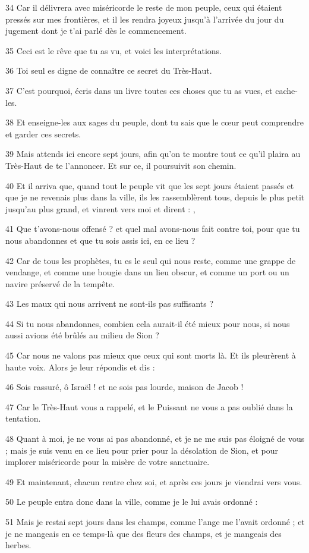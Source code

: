 \par 34 Car il délivrera avec miséricorde le reste de mon peuple, ceux qui étaient pressés sur mes frontières, et il les rendra joyeux jusqu'à l'arrivée du jour du jugement dont je t'ai parlé dès le commencement.
\par 35 Ceci est le rêve que tu as vu, et voici les interprétations.
\par 36 Toi seul es digne de connaître ce secret du Très-Haut.
\par 37 C'est pourquoi, écris dans un livre toutes ces choses que tu as vues, et cache-les.
\par 38 Et enseigne-les aux sages du peuple, dont tu sais que le cœur peut comprendre et garder ces secrets.
\par 39 Mais attends ici encore sept jours, afin qu'on te montre tout ce qu'il plaira au Très-Haut de te l'annoncer. Et sur ce, il poursuivit son chemin.
\par 40 Et il arriva que, quand tout le peuple vit que les sept jours étaient passés et que je ne revenais plus dans la ville, ils les rassemblèrent tous, depuis le plus petit jusqu'au plus grand, et vinrent vers moi et dirent : ,
\par 41 Que t'avons-nous offensé ? et quel mal avons-nous fait contre toi, pour que tu nous abandonnes et que tu sois assis ici, en ce lieu ?
\par 42 Car de tous les prophètes, tu es le seul qui nous reste, comme une grappe de vendange, et comme une bougie dans un lieu obscur, et comme un port ou un navire préservé de la tempête.
\par 43 Les maux qui nous arrivent ne sont-ils pas suffisants ?
\par 44 Si tu nous abandonnes, combien cela aurait-il été mieux pour nous, si nous aussi avions été brûlés au milieu de Sion ?
\par 45 Car nous ne valons pas mieux que ceux qui sont morts là. Et ils pleurèrent à haute voix. Alors je leur répondis et dis :
\par 46 Sois rassuré, ô Israël ! et ne sois pas lourde, maison de Jacob !
\par 47 Car le Très-Haut vous a rappelé, et le Puissant ne vous a pas oublié dans la tentation.
\par 48 Quant à moi, je ne vous ai pas abandonné, et je ne me suis pas éloigné de vous ; mais je suis venu en ce lieu pour prier pour la désolation de Sion, et pour implorer miséricorde pour la misère de votre sanctuaire.
\par 49 Et maintenant, chacun rentre chez soi, et après ces jours je viendrai vers vous.
\par 50 Le peuple entra donc dans la ville, comme je le lui avais ordonné :
\par 51 Mais je restai sept jours dans les champs, comme l'ange me l'avait ordonné ; et je ne mangeais en ce temps-là que des fleurs des champs, et je mangeais des herbes.

